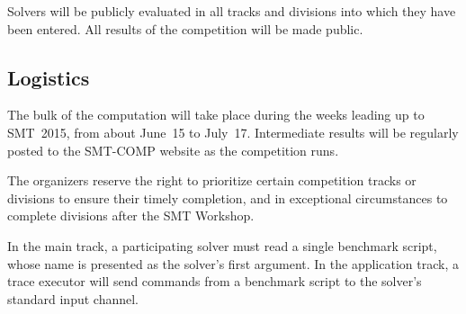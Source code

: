 \documentclass[12pt]{article}
\begin{document}
Solvers will be publicly evaluated in all tracks and divisions into
which they have been entered.  All results of the competition will be
made public.

\subsection{Logistics}
\label{sec:logistics}

%
The bulk of the computation will take place during the weeks leading
up to SMT~2015, from about June~15 to July~17.  Intermediate results
will be regularly posted to the SMT-COMP website as the competition
runs.

The organizers reserve the right to prioritize certain competition
tracks or divisions to ensure their timely completion, and in
exceptional circumstances to complete divisions after the SMT
Workshop.

%
In the main track, a participating solver must read a single benchmark
script, whose name is presented as the solver's first argument.  In
the application track, a trace executor will send commands from a
benchmark script to the solver's standard input channel.
\end{document}
